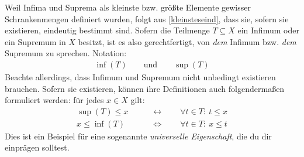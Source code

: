 \begin{nota}
    Weil Infima und Suprema als kleinste bzw. größte Elemente gewisser Schrankenmengen definiert wurden, folgt aus \cref{kleinsteseind}, dass sie, sofern sie existieren, eindeutig bestimmt sind. Sofern die Teilmenge $T\subseteq X$ ein Infimum oder ein Supremum in $X$ besitzt, ist es also gerechtfertigt, von \emph{dem} Infimum bzw. \emph{dem} Supremum zu sprechen. Notation:
    \begin{align*}
        \inf(T) \qquad\text{und}\qquad \sup(T)
    \end{align*}
    Beachte allerdings, dass Infimum und Supremum nicht unbedingt existieren brauchen. Sofern sie existieren, können ihre Definitionen auch folgendermaßen formuliert werden: für jedes $x\in X$ gilt:
    \begin{align*}
        \sup(T)\le x \qquad&\leftrightarrow\qquad \forall t\in T:\ t\le x \\
        x\le \inf(T) \qquad&\Leftrightarrow\qquad \forall t\in T:\ x\le t
    \end{align*}
    Dies ist ein Beispiel für eine sogenannte \emph{universelle Eigenschaft}, die du dir einprägen solltest.
\end{nota}


